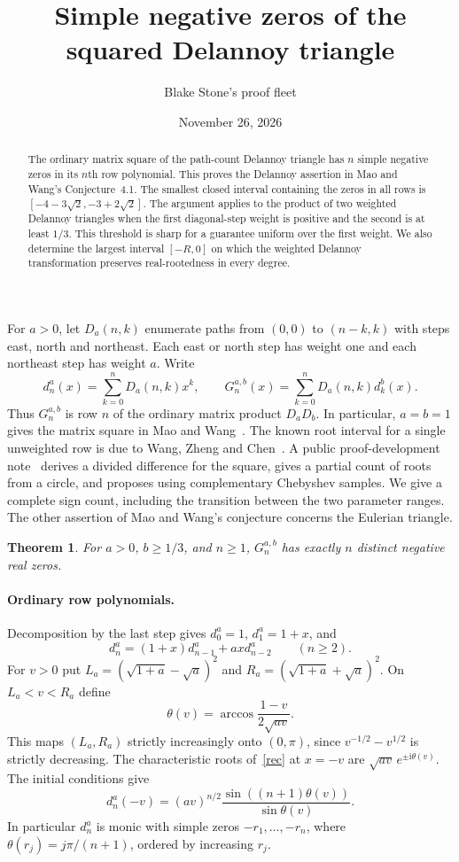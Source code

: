 \documentclass[11pt]{article}
\title{Simple negative zeros of the squared Delannoy triangle}
\author{Blake Stone's proof fleet}
\date{November 26, 2026}
\newtheorem{theorem}{Theorem}
\newcommand{\ii}{\mathrm{i}}
\begin{document}
\maketitle
\begin{abstract}
The ordinary matrix square of the path-count Delannoy triangle has $n$ simple negative zeros in its $n$th row polynomial. This proves the Delannoy assertion in Mao and Wang's Conjecture~4.1. The smallest closed interval containing the zeros in all rows is $[-4-3\sqrt2,-3+2\sqrt2]$. The argument applies to the product of two weighted Delannoy triangles when the first diagonal-step weight is positive and the second is at least $1/3$. This threshold is sharp for a guarantee uniform over the first weight. We also determine the largest interval $[-R,0]$ on which the weighted Delannoy transformation preserves real-rootedness in every degree.
\end{abstract}

For $a>0$, let $D_a(n,k)$ enumerate paths from $(0,0)$ to $(n-k,k)$ with steps east, north and northeast. Each east or north step has weight one and each northeast step has weight $a$. Write
\[
 d_n^a(x)=\sum_{k=0}^n D_a(n,k)x^k,
 \qquad G_n^{a,b}(x)=\sum_{k=0}^n D_a(n,k)d_k^b(x).
\]
Thus $G_n^{a,b}$ is row $n$ of the ordinary matrix product $D_aD_b$. In particular, $a=b=1$ gives the matrix square in Mao and Wang~\cite[Conj.~4.1]{MW}. The known root interval for a single unweighted row is due to Wang, Zheng and Chen~\cite{WZC}. A public proof-development note~\cite{TT} derives a divided difference for the square, gives a partial count of roots from a circle, and proposes using complementary Chebyshev samples. We give a complete sign count, including the transition between the two parameter ranges. The other assertion of Mao and Wang's conjecture concerns the Eulerian triangle.

\begin{theorem}\label{thm}
For $a>0$, $b\ge1/3$, and $n\ge1$, $G_n^{a,b}$ has exactly $n$ distinct negative real zeros.
\end{theorem}

\paragraph{Ordinary row polynomials.}
Decomposition by the last step gives $d_0^a=1$, $d_1^a=1+x$, and
\begin{equation}\label{rec}
 d_n^a=(1+x)d_{n-1}^a+axd_{n-2}^a \qquad (n\ge2).
\end{equation}
For $v>0$ put $L_a=(\sqrt{1+a}-\sqrt a)^2$ and $R_a=(\sqrt{1+a}+\sqrt a)^2$. On $L_a<v<R_a$ define
\[
 \theta(v)=\arccos\frac{1-v}{2\sqrt{av}}.
\]
This maps $(L_a,R_a)$ strictly increasingly onto $(0,\pi)$, since $v^{-1/2}-v^{1/2}$ is strictly decreasing. The characteristic roots of~\eqref{rec} at $x=-v$ are $\sqrt{av}\,e^{\pm\ii\theta(v)}$. The initial conditions give
\begin{equation}\label{cheb}
 d_n^a(-v)=(av)^{n/2}\frac{\sin((n+1)\theta(v))}{\sin\theta(v)}.
\end{equation}
In particular $d_n^a$ is monic with simple zeros $-r_1,\ldots,-r_n$, where $\theta(r_j)=j\pi/(n+1)$, ordered by increasing $r_j$.
\end{document}
